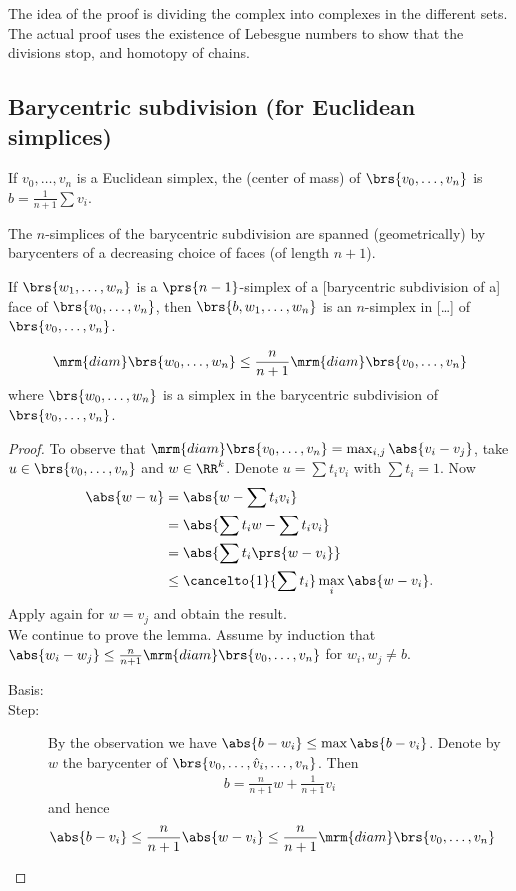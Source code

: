 \documentclass[10pt,a4paper,twoside,openany,hidelinks]{book}
\begin{document}
The idea of the proof is dividing the complex into complexes in the different sets. The actual proof uses the existence of Lebesgue numbers to show that the divisions stop, and homotopy of chains.

\subsection{Barycentric subdivision (for Euclidean simplices)}
\begin{definition}
If $v_0, \ldots, v_n$ is a Euclidean simplex, the  (center of mass) of $\brs{v_0, \ldots, v_n}$ is $b = \frac{1}{n+1} \sum v_i$.
\end{definition}
\begin{definition}
The $n$-simplices of the barycentric subdivision are spanned (geometrically) by barycenters of a decreasing choice of faces (of length $n+1$).
\end{definition}
\begin{remark}
If $\brs{w_1, \ldots, w_n}$ is a $\prs{n-1}$-simplex of a [barycentric subdivision of a] face of $\brs{v_0, \ldots, v_n}$, then $\brs{b, w_1, \ldots, w_n}$ is an $n$-simplex in [\ldots] of $\brs{v_0, \ldots, v_n}$.
\end{remark}
\begin{lemma}
\[\mrm{diam} \brs{w_0, \ldots, w_n} \leq \frac{n}{n+1} \mrm{diam}\brs{v_0, \ldots, v_n}\]
where $\brs{w_0, \ldots, w_n}$ is a simplex in the barycentric subdivision of $\brs{v_0, \ldots, v_n}$.
\end{lemma}
\begin{proof}
To observe that $\mrm{diam}\brs{v_0, \ldots, v_n} = \max_{i,j}\abs{v_i - v_j}$, take $u \in \brs{v_0, \ldots, v_n}$ and $w \in \RR^k$. Denote $u = \sum t_i v_i$ with $\sum t_i = 1$.
Now
\begin{align*}
\abs{w-u} &= \abs{w - \sum t_i v_i} \\
&= \abs{\sum t_i w - \sum t_i v_i} \\
&= \abs{\sum t_i\prs{w-v_i}} \\
&\leq \cancelto{1}{\sum t_i} \max_{i} \abs{w-v_i} \text{.}
\end{align*}
Apply again for $w = v_j$ and obtain the result.\\
We continue to prove the lemma.
Assume by induction that $\abs{w_i - w_j} \leq \frac{n}{n+1} \mrm{diam} \brs{v_0, \ldots, v_n}$
for $w_i, w_j \neq b$.
\begin{description}
\item[Basis:]

\item[Step:]
By the observation we have $\abs{b - w_i} \leq \max \abs{b - v_i}$.
Denote by $w$ the barycenter of $\brs{v_0, \ldots, \hat{v}_i, \ldots, v_n}$.
Then
\begin{align*}
b = \frac{n}{n+1}w + \frac{1}{n+1}v_i
\end{align*}
and hence
\begin{align*}
\abs{b-v_i} &\leq \frac{n}{n+1} \abs{w - v_i} \leq \frac{n}{n+1} \mrm{diam}\brs{v_0, \ldots, v_n}
\end{align*}
\end{description}
\end{proof}
\end{document}
